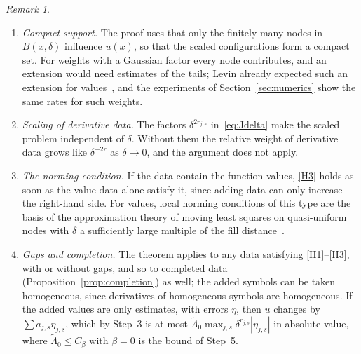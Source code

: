 \documentclass[12pt]{amsart}
\theoremstyle{definition}
\theoremstyle{remark}
\newtheorem{remark}[theorem]{Remark}
\begin{document}
\begin{remark}\label{rem:convergence}
\begin{enumerate}[label=(\alph*)]
  \item \emph{Compact support.} The proof uses that only the finitely many nodes in
        $B(x,\delta)$ influence $u(x)$, so that the scaled configurations form a compact set.
        For weights with a Gaussian factor every node contributes, and an extension would need
        estimates of the tails; Levin already expected such an extension for
        values~\cite[p.~1524]{Levin1998}, and the experiments of Section~\ref{sec:numerics}
        show the same rates for such weights.
  \item \emph{Scaling of derivative data.} The factors $\delta^{2r_{j,s}}$ in~\eqref{eq:Jdelta}
        make the scaled problem independent of $\delta$. Without them the relative weight of
        derivative data grows like $\delta^{-2r}$ as $\delta\to0$, and the argument does not
        apply.
  \item \emph{The norming condition.} If the data contain the function values, \ref{H3} holds
        as soon as the value data alone satisfy it, since adding data can only increase the
        right-hand side. For values, local norming conditions of this type are the basis of the
        approximation theory of moving least squares on quasi-uniform nodes with $\delta$ a
        sufficiently large multiple of the fill distance~\cite[Chapters~3 and~4]{Wendland2005}.
  \item \emph{Gaps and completion.} The theorem applies to any data satisfying
        \ref{H1}--\ref{H3}, with or without gaps, and so to completed data
        (Proposition~\ref{prop:completion}) as well; the added symbols can be taken homogeneous,
        since derivatives of homogeneous symbols are homogeneous. If the added values are only estimates,
        with errors $\eta$, then $u$ changes by $\sum a_{j,s}\eta_{j,s}$, which by Step~3 is at
        most $\tilde\Lambda_0\max_{j,s}\delta^{r_{j,s}}|\eta_{j,s}|$ in absolute value, where
        $\tilde\Lambda_0\le C_\beta$ with $\beta=0$ is the bound of Step~5.
\end{enumerate}
\end{remark}

\end{document}
